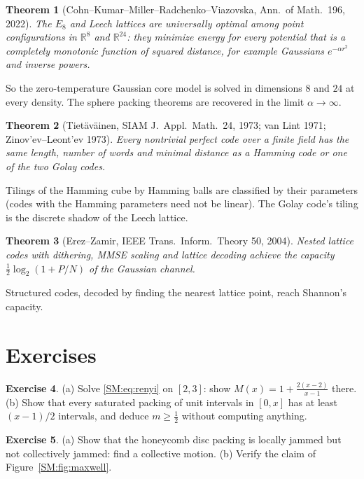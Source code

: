 \documentclass[11pt,openany]{book}
\theoremstyle{plain}
\newtheorem{theorem}{Theorem}[chapter]
\theoremstyle{definition}
\newtheorem{exercise}[theorem]{Exercise}
\theoremstyle{remark}
\newcommand{\R}{\mathbb{R}}
\begin{document}
\begin{theorem}[Cohn--Kumar--Miller--Radchenko--Viazovska, Ann.\ of Math.\ 196, 2022]
The $E_8$ and Leech lattices are universally optimal among point configurations in $\R^8$ and $\R^{24}$:
they minimize energy for every potential that is a completely monotonic function of squared distance,
for example Gaussians $e^{-\alpha r^2}$ and inverse powers.
\end{theorem}
\noindent So the zero-temperature Gaussian core model is solved in dimensions $8$ and $24$ at every
density. The sphere packing theorems are recovered in the limit $\alpha\to\infty$.

\begin{theorem}[Tiet\"av\"ainen, SIAM J.~Appl.\ Math.\ 24, 1973; van Lint 1971; Zinov'ev--Leont'ev 1973]\label{SM:thm:perfect}
Every nontrivial perfect code over a finite field has the same length, number of words and minimal
distance as a Hamming code or one of the two Golay codes.
\end{theorem}
\noindent Tilings of the Hamming cube by Hamming balls are classified by their parameters (codes with
the Hamming parameters need not be linear). The Golay code's tiling is the
discrete shadow of the Leech lattice.

\begin{theorem}[Erez--Zamir, IEEE Trans.\ Inform.\ Theory 50, 2004]
Nested lattice codes with dithering, MMSE scaling and lattice decoding achieve the capacity
$\frac12\log_2(1+P/N)$ of the Gaussian channel.
\end{theorem}
\noindent Structured codes, decoded by finding the nearest lattice point, reach Shannon's capacity.

\section*{Exercises}


\begin{exercise}
(a) Solve \eqref{SM:eq:renyi} on $[2,3]$: show $M(x)=1+\frac{2(x-2)}{x-1}$ there. (b) Show that every saturated
packing of unit intervals in $[0,x]$ has at least $(x-1)/2$ intervals, and deduce $m\ge\frac12$ without
computing anything.
\end{exercise}

\begin{exercise}
(a) Show that the honeycomb disc packing is locally jammed but not collectively jammed: find a collective
motion. (b) Verify the claim of Figure~\ref{SM:fig:maxwell}.
\end{exercise}
\end{document}
